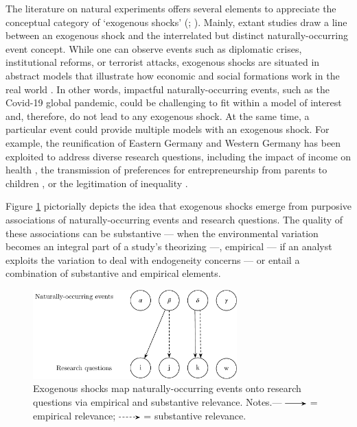 \documentclass[11pt]{article}
\begin{document}
\begin{refsection}
\noindent The literature on natural experiments offers several elements to
appreciate the conceptual category of `exogenous shocks' (\cite[for an overview
of the natural experiment design, see for example][]{withers_li_2021,
dunning_2012,craig_et_al_2017,keele_et_al_2016}; \cite[for a review of the
application of this design, see][]{sekhon_titiunik_2012,sieweke_santoni_2020,
roseinzweig_et_al_2000}). Mainly, extant studies draw a line between an
exogenous shock and the interrelated but distinct naturally-occurring event
concept. While one can observe events such as diplomatic crises, institutional
reforms, or terrorist attacks, exogenous shocks are situated in abstract models
that illustrate how economic and social formations work in the real world
\autocite{morgan_2012}. In other words, impactful naturally-occurring events,
such as the Covid-19 global pandemic, could be challenging to fit within a model
of interest and, therefore, do not lead to any exogenous shock. At the same
time, a particular event could provide multiple models with an exogenous shock.
For example, the reunification of Eastern Germany and Western Germany has been
exploited to address diverse research questions, including the impact of income
on health \autocite[e.g.,][]{frijters_et_al_2004}, the transmission of
preferences for entrepreneurship from parents to children
\autocite[e.g.,][]{wyrwich_2015}, or the legitimation of inequality
\autocite[e.g.,][]{haack_sieweke_2018}.

Figure \ref{fig:event_rq_mapping} pictorially depicts the idea that exogenous 
shocks emerge from purposive associations of naturally-occurring events
and research questions. The quality of these associations can be substantive 
--- when the environmental variation becomes an integral part of a study's 
theorizing ---, empirical --- if an analyst exploits the variation to deal with
endogeneity concerns --- or entail a combination of substantive and
empirical elements.

\begin{figure}[!htbp]
  \centering
  \includegraphics[width=0.7\textwidth]{exhibits/event_rq_mapping.pdf}
  \caption{Exogenous shocks map naturally-occurring events onto 
  research questions via empirical and substantive relevance. Notes.---
  \includegraphics[width=0.075\textwidth]{exhibits/event_rq_mapping_0.pdf}
  = empirical relevance; 
  \includegraphics[width=0.075\textwidth]{exhibits/event_rq_mapping_1.pdf}
   = substantive relevance.}
  \label{fig:event_rq_mapping}
\end{figure}


\end{refsection}
\end{document}
